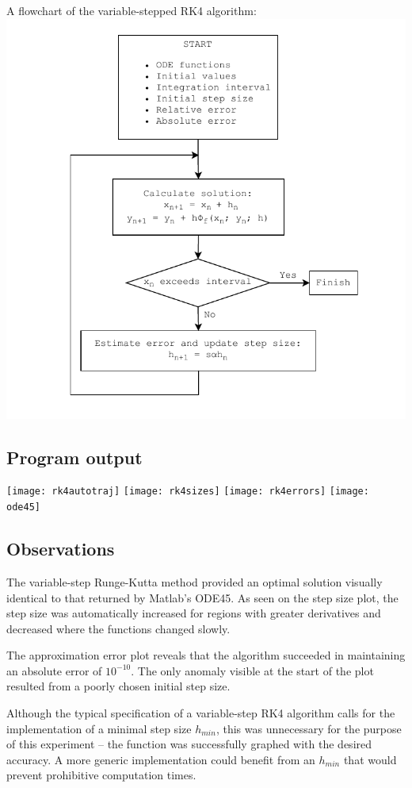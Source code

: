 \documentclass{article}
\begin{document}
	A flowchart of the variable-stepped RK4 algorithm:\\
	\includegraphics[width=\textwidth]{flowchart}
	
	\subsection{Program output}
	
	\texttt{[image: rk4autotraj]}
	\texttt{[image: rk4sizes]}
	\texttt{[image: rk4errors]}
	\texttt{[image: ode45]}
	
	\newpage
	\subsection{Observations}
	
	The variable-step Runge-Kutta method provided an optimal solution
	visually identical to that returned by Matlab's ODE45. As seen on the
	step size plot, the step size was automatically increased for regions
	with greater derivatives and decreased where the functions changed
	slowly.
	
	The approximation error plot reveals that the algorithm succeeded in
	maintaining an absolute error of $10^{-10}$. The only anomaly visible
	at the start of the plot resulted from a poorly chosen initial step
	size.
	
	Although the typical specification of a variable-step RK4 algorithm
	calls for the implementation of a minimal step size $h_{min}$, this was
	unnecessary for the purpose of this experiment -- the function was
	successfully graphed with the desired accuracy. A more generic
	implementation could benefit from an $h_{min}$ that would prevent
	prohibitive computation times.
	
\end{document}
